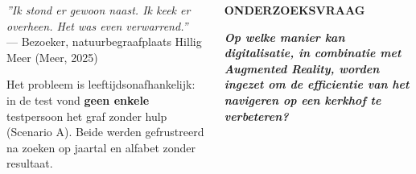 \documentclass[final]{beamer}
\begin{document}
\begin{frame}[t]{}
\begin{columns}[T, totalwidth=\linewidth]
\begin{tcolorbox}[postercard]
                \vspace{2.5mm}
                \begin{tcolorbox}[colback=hogentcream2, colframe=hogentcream2, arc=2mm,
                    boxrule=0pt, left=4mm, right=4mm, top=2mm, bottom=2mm,
                    borderline west={1.4mm}{0pt}{hogentred}]
                    {\normalsize\itshape\color{hogentred!80!black}%
                        ''Ik stond er gewoon naast. Ik keek er overheen. Het was even verwarrend.''}
                    \\[1.5mm]
                    {\small\color{hogentmuted}%
                        --- Bezoeker, natuurbegraafplaats Hillig Meer (Meer, 2025)}
                \end{tcolorbox}
                
                \vspace{2.5mm}
                {\normalsize Het probleem is leeftijdsonafhankelijk: in de test vond
                    \textbf{geen enkele} testpersoon het graf zonder hulp (Scenario A).
                    Beide werden gefrustreerd na zoeken op jaartal en alfabet zonder resultaat.}
            \end{tcolorbox}
            
            \vspace{2mm}
            
            \begin{tcolorbox}[redcard]
                {\small\bfseries\color{white!60!hogentred}%
                    \MakeUppercase{Onderzoeksvraag}}
                \par\vspace{2.5mm}
                {\large\bfseries\itshape
                    Op welke manier kan digitalisatie, in combinatie met Augmented Reality,
                    worden ingezet om de efficientie van het navigeren op een kerkhof te
                    verbeteren?}
            \end{tcolorbox}
            
            \vspace{2mm}
            

\end{columns}
\end{frame}
\end{document}
